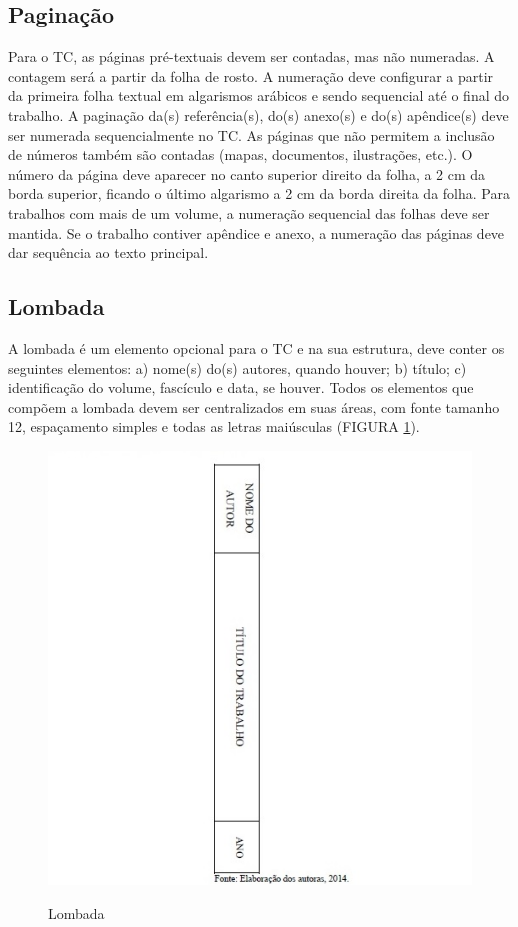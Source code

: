 \subsection{Paginação}

Para o TC, as páginas pré-textuais devem ser contadas, mas não numeradas. A contagem será a partir da folha de rosto. A numeração deve configurar a partir da primeira folha textual em algarismos arábicos e sendo sequencial até o final do trabalho. 
A paginação da(s) referência(s), do(s) anexo(s) e do(s) apêndice(s) deve ser numerada sequencialmente no TC. As páginas que não permitem a inclusão de números também são contadas (mapas, documentos, ilustrações, etc.).
O número da página deve aparecer no canto superior direito da folha, a 2 cm da borda superior, ficando o último algarismo a 2 cm da borda direita da folha.
Para trabalhos com mais de um volume, a numeração sequencial das folhas deve ser mantida. Se o trabalho contiver apêndice e anexo, a numeração das páginas deve dar sequência ao texto principal.

\subsection{Lombada}

A lombada é um elemento opcional para o TC e na sua estrutura, deve conter os seguintes elementos: 
a)	nome(s) do(s) autores, quando houver;
b)	título;
c)	identificação do volume, fascículo e data, se houver.
Todos os elementos que compõem a lombada devem ser centralizados em suas áreas, com fonte tamanho 12, espaçamento simples e todas as letras maiúsculas (FIGURA \ref{fig:lombada}).

\begin{figure}[h]
	\caption{Lombada}
    \centering
    {\parbox{16cm}{
		\includegraphics[scale=1.1]{images/Fig3.jpg}
	    \label{fig:lombada}
	    \hspace{5.7cm}{Fonte: Elaboração das Autoras, 2014}
    }}
\end{figure}

% 
%